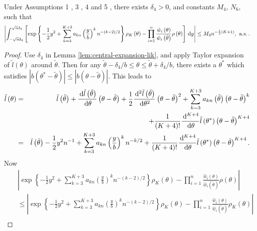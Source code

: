 \begin{lemma}
\label{lem:central-expansion-post-prod}%
 Under  Assumptions 1 , 3 , 4 and 5 ,  there exists  $\delta_{4}>0$, and constants
$M_{4}$, $N_{6}$, such that 
\begin{equation}
\left|\int_{-\sqrt{n}\delta_{4}}^{\sqrt{n}\delta_{4}}\left[\exp\left\{ -\frac{1}{2}y^{2}+\sum_{k=3}^{K+3}a_{kn}\left(\frac{y}{b}\right)^{k}n^{-\left(k-2\right)/2}\right\} \rho_{K}\left(\theta\right)-\prod_{i=1}^{n}\frac{\hat{w}_{i}\left(\theta\right)}{\hat{w}_{i}\left(\tilde{\theta}\right)}\rho\left(\theta\right)\right]\,\mathrm{d} y\right|\le M_{4}n^{-\frac{1}{2}\left(K+1\right)},\:\,\mathrm{a.s.}\,.\label{eq:central-exp-post}
\end{equation}
\end{lemma}
\begin{proof}
Use $\delta_{4}$ in Lemma \ref{lem:central-expansion-lik}, and apply
Taylor expansion of $\tilde{l}\left(\theta\right)$ around $\tilde{\theta}$.
Then for any $\tilde{\theta}-\delta_{4}/b\le\theta\le\tilde{\theta}+\delta_{4}/b$,
there exists a $\theta^{*}$ which satisfies $\left|b\left(\theta^{*}-\tilde{\theta}\right)\right|\le\left|b\left(\theta-\tilde{\theta}\right)\right|$.
This leads to 
\begin{eqnarray*}
\tilde{l}\left(\theta\right) & = & \tilde{l}\left(\tilde{\theta}\right)+\frac{\,\mathrm{d}\tilde{l}\left(\tilde{\theta}\right)}{\,\mathrm{d}\theta}\left(\theta-\tilde{\theta}\right)+\frac{1}{2}\frac{\,\mathrm{d}^{2}\tilde{l}\left(\tilde{\theta}\right)}{\,\mathrm{d}\theta^{2}}\left(\theta-\tilde{\theta}\right)^{2}+\sum_{k=3}^{K+3}a_{kn}\left(\tilde{\theta}\right)\left(\theta-\tilde{\theta}\right)^{k}\\
 &  & +\frac{1}{\left(K+4\right)!}\frac{\,\mathrm{d}^{K+4}}{\,\mathrm{d}\theta}\tilde{l}\left(\theta^{*}\right)\left(\theta-\tilde{\theta}\right)^{K+4}\\
 & = & \tilde{l}\left(\tilde{\theta}\right)-\frac{1}{2}y^{2}n^{-1}+\sum_{k=3}^{K+3}a_{kn}\left(\frac{y}{b}\right)^{k}n^{-k/2}+\frac{1}{\left(K+4\right)!}\frac{\,\mathrm{d}^{K+4}}{\,\mathrm{d}\theta}\tilde{l}\left(\theta^{*}\right)\left(\theta-\tilde{\theta}\right)^{K+4}.
\end{eqnarray*}
Now 
\begin{eqnarray*}
 &  & \left|\exp\left\{ -\frac{1}{2}y^{2}+\sum_{k=3}^{K+3}a_{kn}\left(\frac{y}{b}\right)^{k}n^{-\left(k-2\right)/2}\right\} \rho_{K}\left(\theta\right)-\prod_{i=1}^{n}\frac{\hat{w}_{i}\left(\theta\right)}{\hat{w}_{i}\left(\tilde{\theta}\right)}\rho\left(\theta\right)\right|\\
 &  & \le\left|\exp\left\{ -\frac{1}{2}y^{2}+\sum_{k=3}^{K+3}a_{kn}\left(\frac{y}{b}\right)^{k}n^{-\left(k-2\right)/2}\right\} \rho_{K}\left(\theta\right)-\prod_{i=1}^{n}\frac{\hat{w}_{i}\left(\theta\right)}{\hat{w}_{i}\left(\tilde{\theta}\right)}\rho_{K}\left(\theta\right)\right|\\

\end{eqnarray*}
\end{proof}
